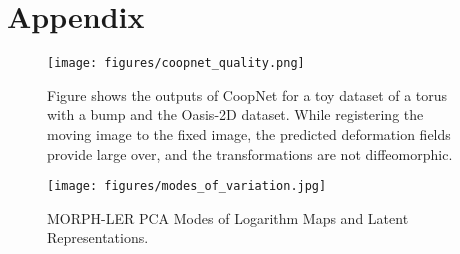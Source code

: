 \section{Appendix}


\begin{figure}[h]
    \centering
    \texttt{[image: figures/coopnet\_quality.png]}
    \caption{Figure shows the outputs of CoopNet \cite{bhalodia2019cooperative} for a toy dataset of a torus with a bump and the Oasis-2D dataset. While registering the moving image to the fixed image, the predicted deformation fields provide large over, and the transformations are not diffeomorphic.}
    \label{fig:coopnet_eg}
\end{figure}

\begin{figure}
    \centering
    \texttt{[image: figures/modes\_of\_variation.jpg]}
    \caption{MORPH-LER PCA Modes of Logarithm Maps and Latent Representations.}
    \label{fig:all_modes}
\end{figure}